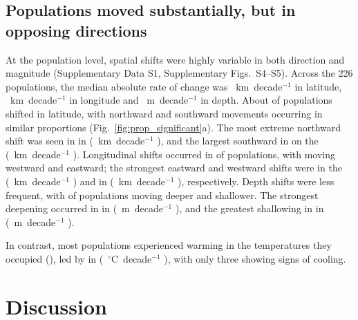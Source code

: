 \documentclass[9pt,twocolumn,twoside]{pnas-new}
\begin{document}
\subsection*{Populations moved substantially, but in opposing directions}




At the population level, spatial shifts were highly variable in both direction and magnitude (Supplementary Data S1, Supplementary Figs.~S4--S5). Across the 226 populations, the median absolute rate of change was \LatMedAbs{}~km~decade$^{-1}$ in latitude, \LonMedAbs{}~km~decade$^{-1}$ in longitude and \DepthMedAbs{}~m~decade$^{-1}$ in depth. About \LatPerc{} of populations shifted in latitude, with northward and southward movements occurring in similar proportions (Fig.~\ref{fig:prop_significant}a). The most extreme northward shift was seen in \MaxLatSpecies{} in \MaxLatRegion{} (\MaxLatMedian{}~km~decade$^{-1}$ \MaxLatCI{}), and the largest southward in \MinLatSpecies{} on the \MinLatRegion{} (\MinLatMedian{}~km~decade$^{-1}$ \MinLatCI{}). Longitudinal shifts occurred in \LonPerc{} of populations, with \LonWestingPerc{} moving westward and \LonEastingPerc{} eastward; the strongest eastward and westward shifts were \MaxLonSpecies{} in the \MaxLonRegion{} (\MaxLonMedian{}~km~decade$^{-1}$ \MaxLonCI{}) and \MinLonSpecies{} in \MinLonRegion{} (\MinLonMedian{}~km~decade$^{-1}$ \MinLonCI{}), respectively. Depth shifts were less frequent, with \DepthDeepeningPerc{} of populations moving deeper and \DepthShallowingPerc{} shallower. The strongest deepening occurred in \MaxDepthSpecies{} in \MaxDepthRegion{} (\MaxDepthMedian{}~m~decade$^{-1}$ \MaxDepthCI{}), and the greatest shallowing in \MinDepthSpecies{} in \MinDepthRegion{} (\MinDepthMedian{}~m~decade$^{-1}$ \MinDepthCI{}).

In contrast, most populations experienced warming in the temperatures they occupied (\ThermalPerc{}), led by \MaxThermalSpecies{} in \MaxThermalRegion{} (\MaxThermalMedian{}~$^\circ$C~decade$^{-1}$ \MaxThermalCI{}), with only three showing signs of cooling.

\section*{Discussion}
\end{document}
